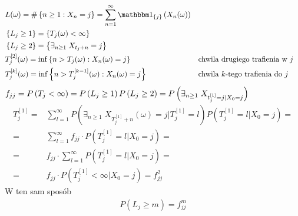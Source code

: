 \begin{align*}
&L(\omega)=\#\left\{n\ge 1:X_n=j\right\}=\sum_{n=1}^{\infty }\mathbbm1_{\left\{j\right\}}\left(X_n(\omega)\right)\\
&\left\{L_j\ge1\right\}=\left\{T_j(\omega)<\infty \right\}\\
&\left\{L_j\ge 2\right\}=\left\{\exists_{n\ge 1}\;X_{t_j+n}=j\right\}\\
&T_j^{[2]}(\omega)=\inf\left\{n>T_j(\omega):X_n(\omega)=j\right\}&&\text{chwila drugiego trafienia w }j\\
&T_j^{[k]}(\omega)=\inf\left\{n>T_j^{[k-1]}(\omega):X_n(\omega)=j\right\}&&\text{chwila $ k $-tego trafienia do }j
\end{align*}
$ f_{jj}=
P\left(T_j<\infty \right)=
P\left(L_j\ge1\right)\\
P\left(L_j\ge2\right)=P\left(\exists_{n\ge 1}\;X_{t_j^{[1]}=j|X_0=j}\right) $
\begin{align*}
T_j^{[1]}=&\sum_{l=1}^{\infty }P\left(\exists_{n\ge 1}\;X_{T_j^{[1]}+n}(\omega)=j|T_j^{[1]}=l\right)P\left(T_j^{[1]}=l|X_0=j\right)
=\\=&
\sum_{l=1}^{\infty }f_{jj}\cdot P\left(T_j^{[1]}=l|X_0=j\right)
=\\=&
f_{jj}\cdot\sum_{l=1}^{\infty } P\left(T_j^{[1]}=l|X_0=j\right)
=\\=&
f_{jj}\cdot P\left(T_j^{[1]}<\infty |X_0=j\right)
=
f_{jj}^2
\end{align*}
W ten sam sposób
\begin{gather*}
P\left(L_j\ge m\right)=f_{jj}^m
\end{gather*}
